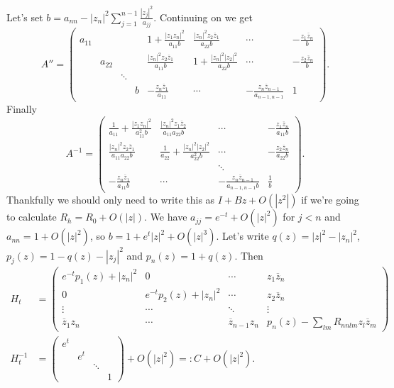 \documentclass[10pt,a4paper]{amsart}
\def\ov#1{\overline{#1}}
\begin{document}
Let's set $b = a_{nn} - |z_n|^2 \sum_{j=1}^{n-1} \frac{|z_j|^2}{a_{jj}}$.
Continuing on we get
$$
A'' =
\left(
\begin{array}{cccc|cccc}
a_{11} &  & &
&
1 + \frac{|z_1z_n|^2}{a_{11} b} &
\frac{|z_n|^2 z_2 \ov z_1}{a_{22} b} &
\cdots &
- \frac{z_1 \ov z_n}{b}
\\
 & a_{22} & &
&
\frac{|z_n|^2 z_2 \ov z_1}{a_{11}b} &
1 + \frac{|z_n|^2|z_2|^2}{a_{22} b} &
\cdots &
-\frac{z_2 \ov z_n}{b}
\\
  & & \ddots & &
\\
 & &  & b
&
-\frac{z_n \ov z_1}{a_{11}} &
\cdots &
-\frac{z_{n} \ov z_{n-1}}{a_{n-1,n-1}} &
1
\end{array}
\right).
$$
Finally
$$
A^{-1} =
\left(
\begin{array}{cccc}
\frac{1}{a_{11}} + \frac{|z_1z_n|^2}{a_{11}^2 b} &
\frac{|z_n|^2 z_1 \ov z_2}{a_{11} a_{22} b} & \cdots &
- \frac{z_1 \ov z_n}{a_{11} b}
\\
\frac{|z_n|^2 z_2 \ov z_1}{a_{11} a_{22} b} &
\frac{1}{a_{22}} + \frac{|z_n|^2|z_2|^2}{a_{22}^2 b} & \cdots &
-\frac{z_2 \ov z_n}{a_{22} b}
\\
& & \ddots &
\\
-\frac{z_n \ov z_1}{a_{11}b} & \cdots &
-\frac{z_{n} \ov z_{n-1}}{a_{n-1,n-1}b} &
\frac 1b
\end{array}
\right).
$$
Thankfully we should only need to write this as $I + B z + O(|z^2|)$
if we're going to calculate $R_h = R_0 + O(|z|)$.
We have $a_{jj} = e^{-t} + O(|z|^2)$ for $j < n$ and $a_{nn} = 1 + O(|z|^2)$,
so $b = 1 + e^{t}|z|^2 + O(|z|^3)$.
Let's write
$q(z) = |z|^2 - |z_n|^2$,
$p_j(z) = 1 - q(z) - |z_j|^2$
and $p_n(z) = 1 + q(z)$.
Then
\begin{align*}
H_t
&= \begin{pmatrix}
e^{-t} p_1(z) + |z_n|^2 &
0 &
\cdots &
z_1 \ov z_n
\\
0 &
e^{-t} p_2(z) + |z_n|^2 &
\cdots &
z_2 \ov z_n
\\
\vdots & \cdots & \ddots & \vdots
\\
\ov z_1 z_n &
\cdots &
\ov z_{n-1} z_{n} &
p_n(z) - \sum\limits_{lm} R_{nnlm} z_l \ov z_m
\end{pmatrix}
\\
H_t^{-1} &=
\begin{pmatrix}
e^t & & &
\\
& e^t & &
\\
& & \ddots &
\\
& & & 1
\end{pmatrix}
+ O(|z|^2)
=: C + O(|z|^2).
\end{align*}
\end{document}
